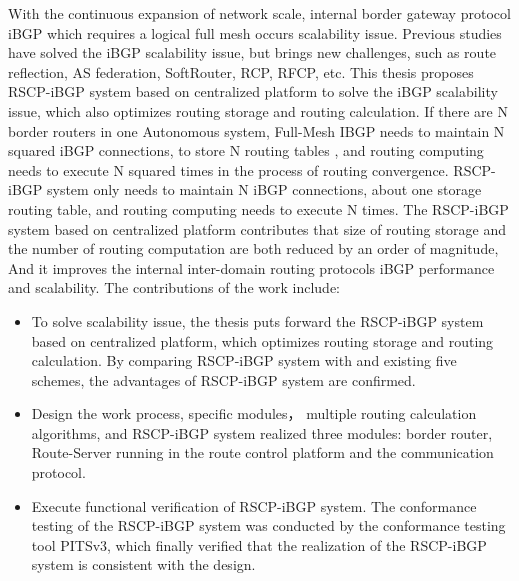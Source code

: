 \begin{eabstract}
   With the continuous expansion of network scale, internal border gateway protocol iBGP which requires a logical full mesh occurs scalability issue. Previous studies have solved the iBGP scalability issue, but brings new challenges, such as route reflection, AS federation, SoftRouter, RCP, RFCP, etc. This thesis proposes RSCP-iBGP system based on centralized platform to solve the iBGP scalability issue, which also optimizes routing storage and routing calculation. If there are N border routers in one Autonomous system, Full-Mesh IBGP needs to maintain N squared iBGP connections, to store N routing tables , and routing computing needs to execute N squared times in the process of routing convergence. RSCP-iBGP system only needs to maintain N iBGP connections, about one storage routing table, and routing computing needs to execute N times. The RSCP-iBGP system based on centralized platform contributes that size of routing storage and the number of routing computation are both reduced by an order of magnitude, And it improves the internal inter-domain routing protocols iBGP performance and scalability. The contributions of the work include:

   \begin{itemize}
    \item To solve scalability issue, the thesis puts forward the RSCP-iBGP system based on centralized platform, which optimizes routing storage and routing calculation. By comparing RSCP-iBGP system with and existing five schemes, the advantages of RSCP-iBGP system are confirmed.
    \item Design the work process, specific modules， multiple routing calculation algorithms, and RSCP-iBGP system realized three modules: border router, Route-Server running in the route control platform and the communication protocol.
    \item Execute functional verification of RSCP-iBGP system. The conformance testing of the RSCP-iBGP system was conducted by the conformance testing tool PITSv3, which finally verified that the realization of the RSCP-iBGP system is consistent with the design.
  \end{itemize}
\end{eabstract}




